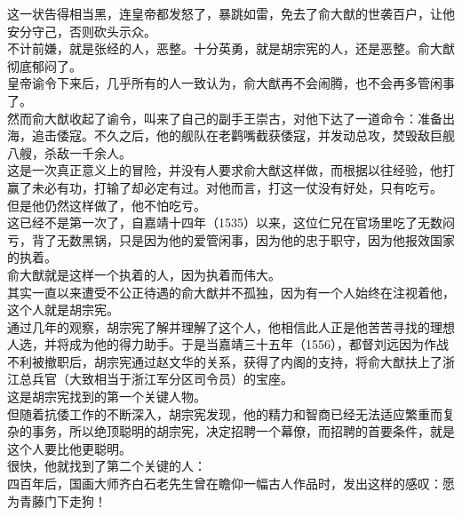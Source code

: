 \begin{multicols}{\theparacolNo}
这一状告得相当黑，连皇帝都发怒了，暴跳如雷，免去了俞大猷的世袭百户，让他安分守己，否则砍头示众。\\

不计前嫌，就是张经的人，恶整。十分英勇，就是胡宗宪的人，还是恶整。俞大猷彻底郁闷了。\\

皇帝谕令下来后，几乎所有的人一致认为，俞大猷再不会闹腾，也不会再多管闲事了。\\

然而俞大猷收起了谕令，叫来了自己的副手王崇古，对他下达了一道命令：准备出海，追击倭寇。不久之后，他的舰队在老鹳嘴截获倭寇，并发动总攻，焚毁敌巨舰八艘，杀敌一千余人。\\

这是一次真正意义上的冒险，并没有人要求俞大猷这样做，而根据以往经验，他打赢了未必有功，打输了却必定有过。对他而言，打这一仗没有好处，只有吃亏。\\

但是他仍然这样做了，他不怕吃亏。\\

这已经不是第一次了，自嘉靖十四年（1535）以来，这位仁兄在官场里吃了无数闷亏，背了无数黑锅，只是因为他的爱管闲事，因为他的忠于职守，因为他报效国家的执着。\\

俞大猷就是这样一个执着的人，因为执着而伟大。\\

其实一直以来遭受不公正待遇的俞大猷并不孤独，因为有一个人始终在注视着他，这个人就是胡宗宪。\\

通过几年的观察，胡宗宪了解并理解了这个人，他相信此人正是他苦苦寻找的理想人选，并将成为他的得力助手。于是当嘉靖三十五年（1556），都督刘远因为作战不利被撤职后，胡宗宪通过赵文华的关系，获得了内阁的支持，将俞大猷扶上了浙江总兵官（大致相当于浙江军分区司令员）的宝座。\\

这是胡宗宪找到的第一个关键人物。\\

但随着抗倭工作的不断深入，胡宗宪发现，他的精力和智商已经无法适应繁重而复杂的事务，所以绝顶聪明的胡宗宪，决定招聘一个幕僚，而招聘的首要条件，就是这个人要比他更聪明。\\

很快，他就找到了第二个关键的人：\\

四百年后，国画大师齐白石老先生曾在瞻仰一幅古人作品时，发出这样的感叹：愿为青藤门下走狗！\\


\end{multicols}
